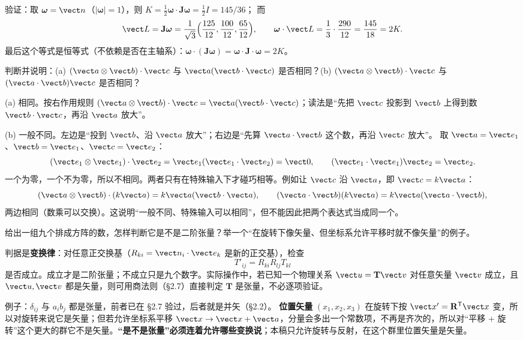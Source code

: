 \documentclass[11pt]{ctexart}
\newcommand{\ten}[1]{\mathbf{#1}}
\begin{document}
验证：取 $\boldsymbol\omega=\vect n$（$|\boldsymbol\omega|=1$），则 $K=\tfrac12\boldsymbol\omega\cdot\ten J\boldsymbol\omega=\tfrac12I=145/36$；
而
\[
\vect L=\ten J\boldsymbol\omega=\frac{1}{\sqrt3}\Bigl(\frac{125}{12},\frac{100}{12},\frac{65}{12}\Bigr),
\qquad
\boldsymbol\omega\cdot\vect L=\frac{1}{3}\cdot\frac{290}{12}=\frac{145}{18}=2K .
\]
最后这个等式是恒等式（不依赖是否在主轴系）：$\boldsymbol\omega\cdot(\ten J\boldsymbol\omega)=\boldsymbol\omega\cdot\ten J\cdot\boldsymbol\omega=2K$。

{判断并说明：(a) $(\vect a\otimes\vect b)\cdot\vect c$ 与 $\vect a(\vect b\cdot\vect c)$ 是否相同？(b) $(\vect a\otimes\vect b)\cdot\vect c$ 与 $(\vect a\cdot\vect b)\vect c$ 是否相同？}

(a) 相同。按右作用规则 $(\vect a\otimes\vect b)\cdot\vect c=\vect a(\vect b\cdot\vect c)$；读法是“先把 $\vect c$ 投影到 $\vect b$ 上得到数 $\vect b\cdot\vect c$，再沿 $\vect a$ 放大”。

(b) 一般不同。左边是“投到 $\vect b$、沿 $\vect a$ 放大”；右边是“先算 $\vect a\cdot\vect b$ 这个数，再沿 $\vect c$ 放大”。
取 $\vect a=\vect e_1$、$\vect b=\vect e_1$、$\vect c=\vect e_2$：
\[
(\vect e_1\otimes\vect e_1)\cdot\vect e_2=\vect e_1(\vect e_1\cdot\vect e_2)=\vect0,
\qquad
(\vect e_1\cdot\vect e_1)\vect e_2=\vect e_2 .
\]
一个为零，一个不为零，所以不相同。两者只有在特殊输入下才碰巧相等。例如让 $\vect c$ 沿 $\vect a$，即 $\vect c=k\vect a$：
\[
(\vect a\otimes\vect b)\cdot(k\vect a)=k\vect a(\vect b\cdot\vect a),
\qquad
(\vect a\cdot\vect b)(k\vect a)=k\vect a(\vect a\cdot\vect b),
\]
两边相同（数乘可以交换）。这说明“一般不同、特殊输入可以相同”，但不能因此把两个表达式当成同一个。

{给出一组九个排成方阵的数，怎样判断它是不是二阶张量？举一个“在旋转下像矢量、但坐标系允许平移时就不像矢量”的例子。}

判据是\textbf{变换律}：对任意正交换基（$R_{ki}=\vect n_i\cdot\vect e_k$ 是新的正交基），检查
\[
T'_{ij}=R_{ki}R_{lj}T_{kl}
\]
是否成立。成立才是二阶张量；不成立只是九个数字。实际操作中，若已知一个物理关系 $\vect u=\ten T\vect v$ 对任意矢量 $\vect v$ 成立，且 $\vect u,\vect v$ 都是矢量，则可用商法则（§2.7）直接判定 $\ten T$ 是张量，不必逐项验证。

例子：$\delta_{ij}$ 与 $a_ib_j$ 都是张量，前者已在 §2.7 验过，后者就是并矢（§2.2）。
\textbf{位置矢量} $(x_1,x_2,x_3)$ 在旋转下按 $\vect x'=\ten R^{\mathsf T}\vect x$ 变，所以对旋转来说它是矢量；但若允许坐标系平移 $\vect x\to\vect x+\vect a$，分量会多出一个常数项，不再是齐次的，所以对“平移 + 旋转”这个更大的群它不是矢量。\textbf{“是不是张量”必须连着允许哪些变换说}；本稿只允许旋转与反射，在这个群里位置矢量是矢量。
\end{document}
